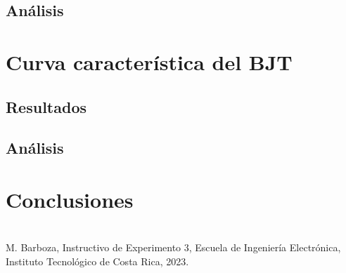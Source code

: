 \documentclass[journal]{IEEEtran}
\begin{document}
\subsection{Análisis}


\section{Curva característica del BJT}
\subsection{Resultados}
\subsection{Análisis}


\section{Conclusiones}


\appendices
\section{}



\begin{thebibliography}{00}
 M. Barboza, Instructivo de Experimento 3,  Escuela de Ingeniería Electrónica, Instituto Tecnológico de Costa Rica, 2023.
\end{thebibliography}

\vfill
\end{document}

